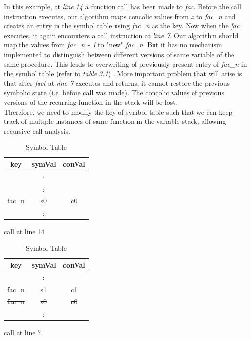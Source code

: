 \documentclass[12pt,oneside]{book}
\begin{document}
In this example, at \textit{line 14} a function call has been made to \textit{fac}. Before the call instruction executes, our algorithm maps concolic values from \textit{x} to \textit{fac\_n} and creates an entry in the symbol table using \textit{fac\_n} as the key. Now when the \textit{fac} executes, it again encounters a call instruction at \textit{line 7}. Our algorithm should map the values from \textit{fac\_n - 1} to "new" \textit{fac\_n}. But it has no mechanism implemented to distinguish between different versions of same variable of the same procedure. This leads to overwriting of previously present entry of \textit{fac\_n} in the symbol table (refer to \textit{table 3.1}) . More important problem that will arise is that after \textit{fact} at \textit{line 7} executes and returns, it cannot restore the previous symbolic state (i.e. before call was made). The concolic values of previous versions of the recurring function in the stack will be lost. \\
Therefore, we need to modify the key of symbol table such that we can keep track of multiple instances of same function in the variable stack, allowing recursive call analysis.



\begin{table}	
\begin{subtable}{.5\linewidth}
\centering
\begin{tabular}{||c c c||} 
 \hline
 \textbf{key} & \textbf{symVal} & \textbf{conVal} \\ [0.5ex] 
 \hline\hline
  & : &   \\ 
  & : &  \\
 \hline
 fac\_n & s0 & c0 \\
 \hline
  & : &  \\ [1ex] 
 \hline
\end{tabular}
\caption{call at line 14}
\end{subtable}%
\begin{subtable}{.5\linewidth}
\centering
 \begin{tabular}{||c c c||} 
 \hline
 \textbf{key} & \textbf{symVal} & \textbf{conVal} \\ [0.5ex] 
 \hline\hline
   & : &   \\ 
  \hline
  fac\_n & s1 & c1 \\
  \st{fac\_n} & \st{s0} & \st{c0} \\
  \hline
  & : &  \\ [1ex] 
 \hline
\end{tabular}
\caption{call at line 7}
\end{subtable}
\caption{Symbol Table} 
\end{table}
\end{document}
